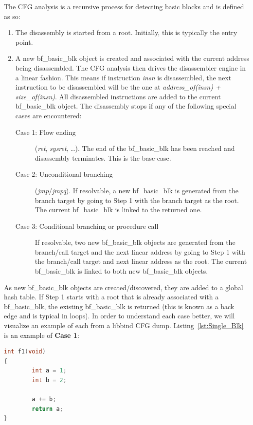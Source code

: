 The CFG analysis is a recursive process for detecting basic blocks and is defined as so:

\noindent\begin{minipage}{\textwidth}
\begin{enumerate}
\item The disassembly is started from a root. Initially, this is typically the entry point.
\item A new bf\_basic\_blk object is created and associated with the current address being disassembled. The CFG analysis then drives the disassembler engine in a linear fashion. This means if instruction \emph{insn} is disassembled, the next instruction to be disassembled will be the one at \emph{address\_of(insn) + size\_of(insn)}. All disassembled instructions are added to the current bf\_basic\_blk object. The disassembly stops if any of the following special cases are encountered:

\begin{description}
\item [Case 1: Flow ending] (\emph{ret}, \emph{sysret}, \ldots). The end of the bf\_basic\_blk has been reached and disassembly terminates. This is the base-case.
\item [Case 2: Unconditional branching] (\emph{jmp}/\emph{jmpq}). If resolvable, a new bf\_basic\_blk is generated from the branch target by going to Step 1 with the branch target as the root. The current bf\_basic\_blk is linked to the returned one.
\item [Case 3: Conditional branching or procedure call] If resolvable, two new bf\_basic\_blk objects are generated from the branch/call target and the next linear address by going to Step 1 with the branch/call target and next linear address as the root. The current bf\_basic\_blk is linked to both new bf\_basic\_blk objects.
\end{description}
\end{enumerate}
\end{minipage}

As new bf\_basic\_blk objects are created/discovered, they are added to a global hash table. If Step 1 starts with a root that is already associated with a bf\_basic\_blk, the existing bf\_basic\_blk is returned (this is known as a back edge and is typical in loops). In order to understand each case better, we will visualize an example of each from a libbind CFG dump. Listing~\ref{lst:Single_Blk} is an example of \textbf{Case 1}:

\noindent\begin{minipage}{\textwidth}
\begin{lstlisting}[language=C,caption={The entire function is a single basic block.},label={lst:Single_Blk}]
int f1(void)
{
        int a = 1;
        int b = 2;

        a += b;
        return a;
}
\end{lstlisting}
\end{minipage}

